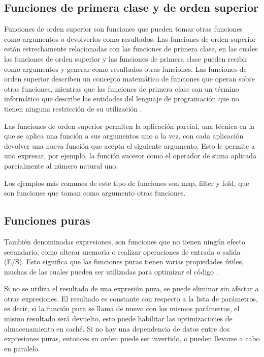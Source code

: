 
\subsection{Funciones de primera clase y de orden superior}

Funciones de orden superior son funciones que pueden tomar otras funciones como argumentos o devolverlos como resultados. Las funciones de orden superior están estrechamente relacionadas con las funciones de primera clase, en las cuales las funciones de orden superior y las funciones de primera clase pueden recibir como argumentos y generar como resultados otras funciones. Las funciones de orden superior describen un concepto matemático de funciones que operan sobre otras funciones, mientras que las funciones de primera clase son un término informático que describe las entidades del lenguaje de programación que no tienen ninguna restricción de su utilización  \cite{wiki:FunctionalProgramming}.

Las funciones de orden superior permiten la aplicación parcial, una técnica en la que se aplica una función a sus argumentos uno a la vez, con cada aplicación devolver una nueva función que acepta el siguiente argumento. Esto le permite a uno expresar, por ejemplo, la función sucesor como el operador de suma aplicada parcialmente al número natural uno.

Los ejemplos más comunes de este tipo de funciones son map, filter y fold, que son funciones que toman como argumento otras funciones.

\subsection{Funciones puras}

También denominadas expresiones, son funciones que no tienen ningún efecto secundario, como alterar memoria o realizar operaciones de entrada o salida (E/S). Esto significa que las funciones puras tienen varias propiedades útiles, muchas de las cuales pueden ser utilizadas para optimizar el código \cite{wiki:FunctionalProgramming}.

Si no se utiliza el resultado de una expresión pura, se puede eliminar sin afectar a otras expresiones. El resultado es constante con respecto a la lista de parámetros, es decir, si la función pura se llama de nuevo con los mismos parámetros, el mismo resultado será devuelto, esto puede habilitar las optimizaciones de almacenamiento en caché. Si no hay una dependencia de datos entre dos expresiones puras, entonces su orden puede ser invertido, o pueden llevarse a cabo en paralelo.

